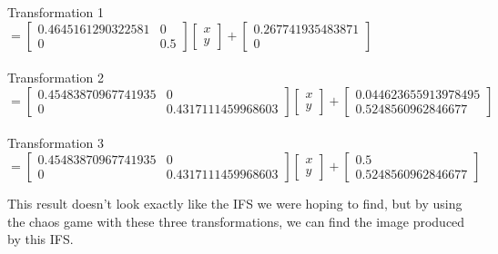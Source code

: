 \documentclass[a4paper,11pt, titlepage]{article}
\theoremstyle{definition}
\theoremstyle{plain}
\theoremstyle{remark}
\theoremstyle{definition}
\begin{document}
Transformation 1 $=\begin{bmatrix} 0.4645161290322581 &0\\0&0.5\end{bmatrix}\begin{bmatrix} x\\y \end{bmatrix} + \begin{bmatrix}0.267741935483871\\0\end{bmatrix}$
\\
\\
Transformation 2 $=\begin{bmatrix} 0.45483870967741935 &0\\0&0.4317111459968603\end{bmatrix}\begin{bmatrix} x\\y \end{bmatrix} + \begin{bmatrix}0.044623655913978495\\0.5248560962846677\end{bmatrix}$
\\
\\
Transformation 3 $=\begin{bmatrix} 0.45483870967741935 &0\\0&0.4317111459968603\end{bmatrix}\begin{bmatrix} x\\y \end{bmatrix} + \begin{bmatrix}0.5\\0.5248560962846677\end{bmatrix}$

This result doesn't look exactly like the IFS we were hoping to find, but by using the chaos game with these three transformations, we can find the image produced by this IFS.
\end{document}
